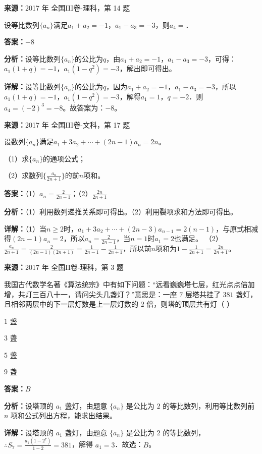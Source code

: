 \begin{question}[points=5]
\textbf{来源：}2017 年 全国III卷-理科，第 14 题\par
设等比数列$\{a_n\}$满足$a_1+a_2=-1$，$a_1-a_3=-3$，则$a_4=$．
\fillin[{$-8$}]
\begin{solution}
\textbf{答案：}$-8$

\textbf{分析：}设等比数列$\{a_n\}$的公比为$q$，由$a_1+a_2=-1$，$a_1-a_3=-3$，可得：$a_1(1+q)=-1$，$a_1(1-q^2)=-3$，解出即可得出。

\textbf{详解：}设等比数列$\{a_n\}$的公比为$q$，因为$a_1+a_2=-1$，$a_1-a_3=-3$，所以$a_1(1+q)=-1$，$a_1(1-q^2)=-3$，解得$a_1=1$，$q=-2$．则$a_4=(-2)^3=-8$。故答案为：$-8$。
\end{solution}
\end{question}

\begin{question}[points=12]
\textbf{来源：}2017 年 全国III卷-文科，第 17 题\par
设数列$\{a_n\}$满足$a_1+3a_2+\cdots+(2n-1)a_n=2n$。

（1）求$\{a_n\}$的通项公式；

（2）求数列$\{\frac{a_n}{2n+1}\}$的前$n$项和。
\begin{solution}
\textbf{答案：}（1）$a_n=\frac{2}{2n-1}$；（2）$\frac{2n}{2n+1}$

\textbf{分析：}（1）利用数列递推关系即可得出。（2）利用裂项求和方法即可得出。

\textbf{详解：}（1）当$n\ge 2$时，$a_1+3a_2+\cdots+(2n-3)a_{n-1}=2(n-1)$，与原式相减得$(2n-1)a_n=2$，所以$a_n=\frac{2}{2n-1}$，当$n=1$时$a_1=2$也满足。
（2）$\frac{a_n}{2n+1}=\frac{2}{(2n-1)(2n+1)}=\frac{1}{2n-1}-\frac{1}{2n+1}$，所以前$n$项和为$1-\frac{1}{2n+1}=\frac{2n}{2n+1}$。
\end{solution}
\end{question}

\begin{question}[points=5]
\textbf{来源：}2017 年 全国II卷-理科，第 3 题\par
我国古代数学名著《算法统宗》中有如下问题：“远看巍巍塔七层，红光点点倍加增，共灯三百八十一，请问尖头几盏灯？”意思是：一座 $7$ 层塔共挂了 $381$ 盏灯，且相邻两层中的下一层灯数是上一层灯数的 $2$ 倍，则塔的顶层共有灯（   ）
\begin{choices}
  \item $1$ 盏
  \item $3$ 盏
  \item $5$ 盏
  \item $9$ 盏
\end{choices}
\begin{solution}
\textbf{答案：}$B$

\textbf{分析：}设塔顶的 $a_1$ 盏灯，由题意 $\{a_n\}$ 是公比为 $2$ 的等比数列，利用等比数列前 $n$ 项和公式列出方程，能求出结果。

\textbf{详解：}设塔顶的 $a_1$ 盏灯，由题意 $\{a_n\}$ 是公比为 $2$ 的等比数列，$\therefore S_7=\frac{a_1(1-2^7)}{1-2}=381$，解得 $a_1=3$．故选：$B$。
\end{solution}
\end{question}

